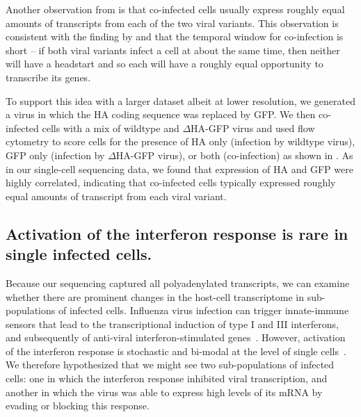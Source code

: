 \documentclass[9pt,lineno]{elife}
\begin{document}
Another observation from  is that co-infected cells usually express roughly equal amounts of transcripts from each of the two viral variants.
This observation is consistent with the finding by \citet{Dou:2017cp} and \citet{Huang:2008gy} that the temporal window for co-infection is short -- if both viral variants infect a cell at about the same time, then neither will have a headstart and so each will have a roughly equal opportunity to transcribe its genes.

To support this idea with a larger dataset albeit at lower resolution, we generated a virus in which the HA coding sequence was replaced by GFP.
We then co-infected cells with a mix of wildtype and $\Delta$HA-GFP virus and used flow cytometry to score cells for the presence of HA only (infection by wildtype virus), GFP only (infection by $\Delta$HA-GFP virus), or both (co-infection) as shown in .
As in our single-cell sequencing data, we found that expression of HA and GFP were highly correlated, indicating that co-infected cells typically expressed roughly equal amounts of transcript from each viral variant.

\subsection{Activation of the interferon response is rare in single infected cells.}
Because our sequencing captured all polyadenylated transcripts, we can examine whether there are prominent changes in the host-cell transcriptome in sub-populations of infected cells.
Influenza virus infection can trigger innate-immune sensors that lead to the transcriptional induction of type I and III interferons, and subsequently of anti-viral interferon-stimulated genes~\citep{Killip:2015dw,Iwasaki:2014dw,crotta2013type}.
However, activation of the interferon response is stochastic and bi-modal at the level of single cells~\citep{Chen:2010cr,shalek2013single,shalek2014single,PerezCidoncha:2014jr,bhushal2017cell,hagai2017gene}.
We therefore hypothesized that we might see two sub-populations of infected cells: one in which the interferon response inhibited viral transcription, and another in which the virus was able to express high levels of its mRNA by evading or blocking this response.
\end{document}
